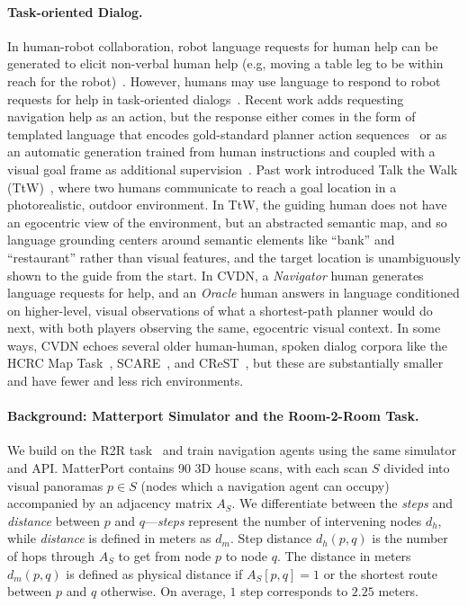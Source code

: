 \documentclass{article}
\newcommand{\dataset}{CVDN}
\newcommand{\nav}{\textit{Navigator}}
\newcommand{\ora}{\textit{Oracle}}
\begin{document}
\paragraph{Task-oriented Dialog.}
In human-robot collaboration, robot language requests for human help can be generated to elicit non-verbal human help (e.g, moving a table leg to be within reach for the robot)~\cite{tellex:rss14}.
However, humans may use language to respond to robot requests for help in task-oriented dialogs~\cite{thomason:icra19,williams:auro19,marge:naacl19}.
Recent work adds requesting navigation help as an action, but the response either comes in the form of templated language that encodes gold-standard planner action sequences~\cite{nguyen:cvpr19} or as an automatic generation trained from human instructions and coupled with a visual goal frame as additional supervision~\cite{nguyen:emnlp19}.
Past work introduced Talk the Walk (TtW)~\cite{devries:arxiv18}, where two humans communicate to reach a goal location in a photorealistic, outdoor environment.
In TtW, the guiding human does not have an egocentric view of the environment, but an abstracted semantic map, and so language grounding centers around semantic elements like ``bank'' and ``restaurant'' rather than visual features, and the target location is unambiguously shown to the guide from the start.
In \dataset{}, a \nav{} human generates language requests for help, and an \ora{} human answers in language conditioned on higher-level, visual observations of what a shortest-path planner would do next, with both players observing the same, egocentric visual context.
In some ways, \dataset{} echoes several older human-human, spoken dialog corpora like the HCRC Map Task~\cite{anderson:ls91}, SCARE~\cite{stoia:lrec08}, and CReST~\cite{eberhard:lrec10}, but these are substantially smaller and have fewer and less rich environments.

\paragraph{Background: Matterport Simulator and the Room-2-Room Task.}
We build on the R2R task~\cite{anderson:cvpr18} and train navigation agents using the same simulator and API.
MatterPort contains 90 3D house scans, with each scan $S$ divided into visual panoramas $p\in S$ (nodes which a navigation agent can occupy) accompanied by an adjacency matrix $A_S$.
We differentiate between the \textit{steps} and \textit{distance} between $p$ and $q$---\textit{steps} represent the number of intervening nodes $d_h$, while \textit{distance} is defined in meters as $d_m$.
Step distance $d_h(p, q)$ is the number of hops through $A_S$ to get from node $p$ to node $q$.
The distance in meters $d_m(p, q)$ is defined as physical distance if $A_S[p,q] = 1$ or the shortest route between $p$ and $q$ otherwise.
On average, $1$ step corresponds to $2.25$ meters.
\end{document}
